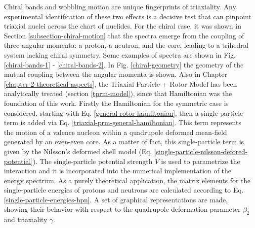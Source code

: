 Chiral bands and wobbling motion are unique fingerprints of triaxiality. Any experimental identification of these two effects is a decisive test that can pinpoint triaxial nuclei across the chart of nuclides. For the chiral case, it was shown in Section \ref{subsection-chiral-motion} that the spectra emerge from the coupling of three angular momenta: a proton, a neutron, and the core, leading to a trihedral system lacking chiral symmetry. Some examples of spectra are shown in Fig. \ref{chiral-bands-1} - \ref{chiral-bands-2}. In Fig. \ref{chiral-geometry} the geometry of the mutual coupling between the angular momenta is shown. Also in Chapter \ref{chapter-2-theoretical-aspects}, the Triaxial Particle + Rotor Model has been analytically treated (section \ref{tprm-model}), since that Hamiltonian was the foundation of this work. Firstly the Hamiltonian for the symmetric case is considered, starting with Eq. \eqref{general-rotor-hamiltonian}, then a single-particle term is added via Eq. \eqref{triaxial-prm-general-hamiltonian}. This term represents the motion of a valence nucleon within a quadrupole deformed mean-field generated by an even-even core. As a matter of fact, this single-particle term is given by the Nilsson's deformed shell model (Eq. \eqref{single-particle-nilsson-defored-potential}). The single-particle potential strength $V$ is used to parametrize the interaction and it is incorporated into the numerical implementation of the energy spectrum. As a purely theoretical application, the matrix elements for the single-particle energies of protons and neutrons are calculated according to Eq. \eqref{single-particle-energies-hpn}. A set of graphical representations are made, showing their behavior with respect to the quadrupole deformation parameter $\beta_2$ and triaxiality $\gamma$. 

